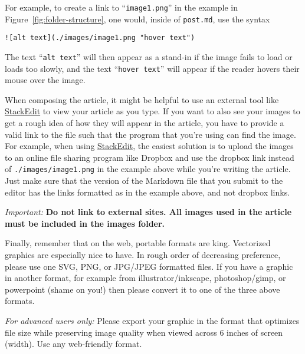 \documentclass[paper=a4, fontsize=11pt]{scrartcl}
\numberwithin{equation}{section}        %
\numberwithin{figure}{section}            %
\numberwithin{table}{section}                %
\begin{document}
For example, to create a link to ``\texttt{image1.png}'' in the example in
Figure~\ref{fig:folder-structure}, one would, inside of \texttt{post.md}, use
the syntax

\begin{verbatim}![alt text](./images/image1.png "hover text")\end{verbatim}

The text ``\texttt{alt text}'' will then appear as a stand-in if the image fails to
load or loads too slowly, and the text ``\texttt{hover text}'' will appear if the
reader hovers their mouse over the image.

When composing the article, it might be helpful to use an external tool like
\href{https://stackedit.io/editor}{StackEdit} to view your article as you type.
If you want to also see your images to get a rough idea of how they will appear
in the article, you have to provide a valid link to the file such that the
program that you're using can find the image. For example, when using
\href{https://stackedit.io/editor}{StackEdit}, the easiest solution is to upload
the images to an online file sharing program like Dropbox and use the dropbox
link instead of \texttt{./images/image1.png} in the example above while you're
writing the article. Just make sure that the version of the Markdown file that you
submit to the editor has the links formatted as in the example above, and not
dropbox links.

\textit{Important:} \textbf{Do not link to external sites. All images used in the article must be
included in the images folder.}

Finally, remember that on the web, portable formats are king. Vectorized graphics are
especially nice to have. In rough order of decreasing preference, please use one
SVG, PNG, or JPG/JPEG formatted files. If you have a graphic in another format,
for example from illustrator/inkscape, photoshop/gimp, or powerpoint (shame on
you!) then please convert it to one of the three above formats.

\emph{For advanced users only:} Please
export your graphic in the format that optimizes file size while preserving image quality
when viewed across 6 inches of screen (width). Use any web-friendly format.
\end{document}
